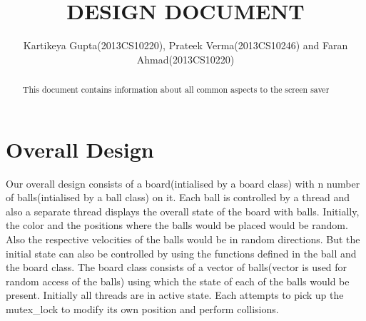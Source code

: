 \setlength{\topmargin}{-.5in}
\setlength{\textheight}{9in}
\setlength{\oddsidemargin}{.125in}
\usepackage{listings}
\usepackage{color} %

\setlength{\textwidth}{6.25in}

\usepackage{listings}
\usepackage{color} 


\title
{DESIGN DOCUMENT}
\author
{Kartikeya Gupta(2013CS10220), Prateek Verma(2013CS10246) and Faran Ahmad(2013CS10220)}
\renewcommand{\today}{January 10, 2015}
\maketitle 
\begin{abstract}
This document contains information about all common aspects to the screen saver
\end{abstract}
\pagebreak 
\section{Overall Design}
Our overall design consists of a board(intialised by a board class) with n number of balls(intialised by a ball class) on it. Each ball is controlled by a thread and also a separate thread displays the overall state of the board with balls. Initially, the color and the positions where the balls would be placed would be random. Also the respective velocities of the balls would be in random directions. But the initial state can also be controlled by using the functions defined in the ball and the board class. The board class consists of a vector of balls(vector is used for random access of the balls) using which the state of each of the balls would be present. Initially all threads are in active state. Each attempts to pick up the mutex_lock to modify its own position and perform collisions. 

